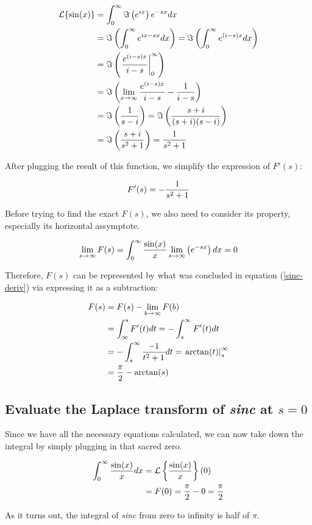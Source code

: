 $$
\begin{aligned}
	\mathcal{L}\{\sin(x)\}&=\int_0^\infty\Im\left(e^{ix}\right)e^{-sx}dx \\
	&=\Im\left(\int_0^\infty e^{ix-sx}dx\right)
	=\Im\left(\int_0^\infty e^{(i-s)x}dx\right) \\
	&=\Im\left(\left.e^{(i-s)x}\over i-s\right|_0^\infty\right) \\
	&=\Im\left(\lim_{x\to\infty}{e^{(i-s)x}\over i-s}-{1\over i-s}\right) \\
	&=\Im\left(1\over s-i\right)=\Im\left(s+i\over(s+i)(s-i)\right) \\
	&=\Im\left(s+i\over s^2+1\right)={1\over s^2+1}
\end{aligned}
$$

After plugging the result of this function, we simplify the expression of
$F'(s)$:

\begin{equation}
	F'(s)=-{1\over s^2+1}
	\label{sinc-deriv}
\end{equation}

Before trying to find the exact $F(s)$, we also need to consider its property,
especially its horizontal assymptote.

$$
\lim_{s\to\infty}F(s)=\int_0^\infty{\sin(x)\over x}
\lim_{s\to\infty}\left(e^{-sx}\right)dx=0
$$

Therefore, $F(s)$ can be represented by what was concluded in equation
(\ref{sinc-deriv}) via expressing it as a subtraction:

$$
\begin{aligned}
	F(s)&=F(s)-\lim_{b\to\infty}F(b) \\
	&=\int_\infty^sF'(t)dt=-\int_s^\infty F'(t)dt \\
	&=-\int_s^\infty{-1\over t^2+1}dt=\left.\arctan(t)\right|_s^\infty \\
	&={\pi\over 2}-\arctan(s)
\end{aligned}
$$

\subsection{Evaluate the Laplace transform of \textit{sinc} at $s=0$}

Since we have all the necessary equations calculated, we can now take down the
integral by simply plugging in that sacred zero.

$$
\begin{aligned}
	\int_0^\infty{\sin(x)\over x}dx&=\mathcal{L}\left\{\sin(x)\over x\right\}(0) \\
	&=F(0)={\pi\over2}-0={\pi\over2}
\end{aligned}
$$

As it turns out, the integral of \textit{sinc} from zero to infinity is half of
$\pi$.
